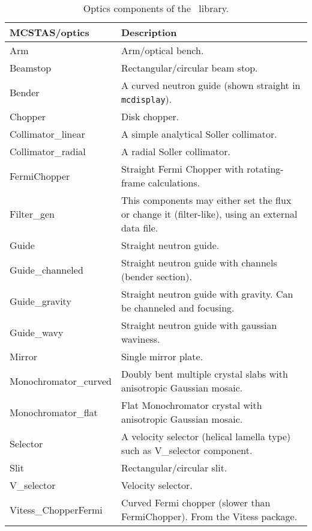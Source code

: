 \begin{table}
  \begin{center}
    {\let\my=\\
    \begin{tabular}{|p{}|p{}|}
      \hline
       {\bf MCSTAS/optics} & Description \\
       \hline
Arm                &  Arm/optical bench. \\
 Beamstop          &   Rectangular/circular beam stop. \\
 Bender            &  A curved neutron guide (shown straight in \verb+mcdisplay+). \\
 Chopper           &   Disk chopper. \\
 Collimator\_linear &  A simple analytical Soller collimator. \\
 Collimator\_radial &  A radial Soller collimator.\\
 FermiChopper      &  Straight Fermi Chopper with rotating-frame calculations. \\
 Filter\_gen        &   This components may either set the flux
                      or change it (filter-like), using
                      an external data file. \\
 Guide             &   Straight neutron guide. \\
 Guide\_channeled   &   Straight neutron guide with
                      channels (bender section). \\
 Guide\_gravity     &  Straight neutron guide with gravity. Can be
                      channeled and focusing. \\
 Guide\_wavy        &  Straight neutron guide with gaussian waviness. \\
 Mirror             &  Single mirror plate. \\

 Monochromator\_curved & Doubly bent multiple crystal
                      slabs with anisotropic Gaussian mosaic. \\
 Monochromator\_flat &  Flat Monochromator crystal with
                      anisotropic Gaussian mosaic. \\
 Selector            & A velocity selector (helical lamella type) such as
                      V\_selector component. \\
 Slit                & Rectangular/circular
                      slit. \\
 V\_selector          & Velocity selector. \\
 Vitess\_ChopperFermi & Curved Fermi chopper (slower than FermiChopper). 
                     From the Vitess package.\\ \hline
    \end{tabular}
    \caption{Optics components of the \MCS\ library.}
    \label{t:comp-optics}
    }
  \end{center}
\end{table}

